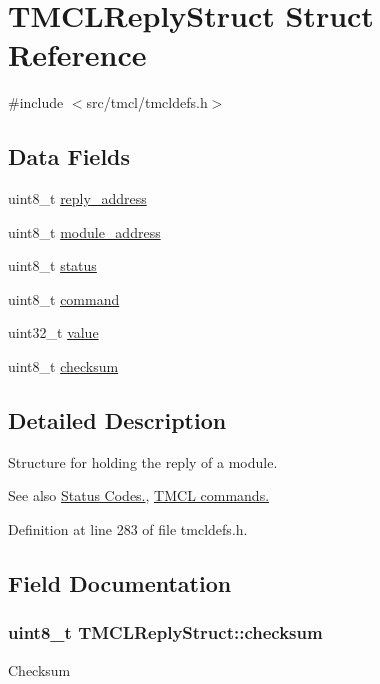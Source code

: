 \hypertarget{structTMCLReplyStruct}{
\section{TMCLReplyStruct Struct Reference}
\label{structTMCLReplyStruct}
}


{\ttfamily \#include $<$src/tmcl/tmcldefs.h$>$}\subsection*{Data Fields}
\begin{DoxyCompactItemize}
\item 
uint8\_\-t \hyperlink{structTMCLReplyStruct_aa7bdb24d8ec498df4a2d2b067211a344}{reply\_\-address}
\item 
uint8\_\-t \hyperlink{structTMCLReplyStruct_ae3ebaa97b939afc79eb0efe8c6ba7e4f}{module\_\-address}
\item 
uint8\_\-t \hyperlink{structTMCLReplyStruct_a74072ff7b4d9d12df630545839131196}{status}
\item 
uint8\_\-t \hyperlink{structTMCLReplyStruct_a40395664fbaf18959cc62531d965a790}{command}
\item 
uint32\_\-t \hyperlink{structTMCLReplyStruct_aace5a128745c0f5b680a160b36cfaea6}{value}
\item 
uint8\_\-t \hyperlink{structTMCLReplyStruct_a64e2a7a1aedc90e4ba9200dcea006469}{checksum}
\end{DoxyCompactItemize}


\subsection{Detailed Description}
Structure for holding the reply of a module.

\begin{DoxySeeAlso}{See also}
\hyperlink{group__StatusCodes}{Status Codes.}, \hyperlink{group__TMCLComm}{TMCL commands.} 
\end{DoxySeeAlso}


Definition at line 283 of file tmcldefs.h.

\subsection{Field Documentation}
\hypertarget{structTMCLReplyStruct_a64e2a7a1aedc90e4ba9200dcea006469}{
\subsubsection[{checksum}]{\setlength{\rightskip}{0pt plus 5cm}uint8\_\-t {\bf TMCLReplyStruct::checksum}}}
\label{structTMCLReplyStruct_a64e2a7a1aedc90e4ba9200dcea006469}
Checksum 

